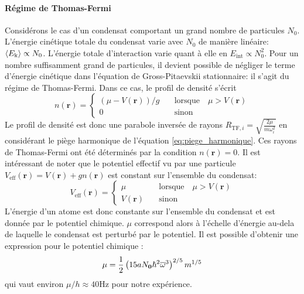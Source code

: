 \paragraph*{Régime de Thomas-Fermi}
Considérons le cas d'un condensat comportant un grand nombre de particules $N_0$. L'énergie cinétique totale du condensat varie avec $N_0$ de manière linéaire: $\left\langle E_{\mathrm{k}}\right\rangle\propto N_0$. L'énergie totale d'interaction varie quant à elle en $E_{\mathrm{int}}\propto N_0^2$. Pour un nombre suffisamment grand de particules, il devient possible de négliger le terme d'énergie cinétique dans l'équation de Gross-Pitaevskii stationnaire: il s'agit du régime de Thomas-Fermi.
Dans ce cas, le profil de densité s'écrit
\begin{equation}
n(\mathbf{r})=\left\{
					\begin{array}{ll}
						(\mu-V(\mathbf{r}))/g &\quad \text{lorsque} \quad \mu>V(\mathbf{r})\\
						0 &\quad \text{sinon}
					\end{array} 
				\right.
\end{equation}
Le profil de densité est donc une parabole inversée de rayons $R_{\mathrm{TF},i}=\sqrt{\frac{2\mu}{m\omega_i^2}}$ en considérant le piège harmonique de l'équation \ref{eq:piege_harmonique}.
Ces rayons de Thomas-Fermi ont été déterminés par la condition $n(\mathbf{r})=0$. Il est intéressant de noter que le potentiel effectif vu par une particule $V_{\mathrm{eff}}(\mathbf{r})=V(\mathbf{r})+gn(\mathbf{r})$ est constant sur l'ensemble du condensat:
\begin{equation}
V_{\mathrm{eff}}(\mathbf{r})= \left\{
									\begin{array}{ll}
										\mu &\quad \text{lorsque} \quad \mu>V(\mathbf{r})\\
										V(\mathbf{r}) &\quad \text{sinon}
									\end{array}
							\right.
\end{equation}
L'énergie d'un atome est donc constante sur l'ensemble du condensat et est donnée par le potentiel chimique. $\mu$ correspond alors à l'échelle d'énergie au-dela de laquelle le condensat est perturbé par le potentiel. Il est possible d'obtenir une expression pour le potentiel chimique \citep{pethick2008bose}: 
\begin{equation}
\mu=\frac{1}{2} \left( 15a N_{\mathbf{0}} \hslash^2 \overline{\omega}^3 \right) ^{2/5} m^{1/5}
\end{equation}
qui vaut environ $\mu/h\approx40$Hz pour notre expérience.

